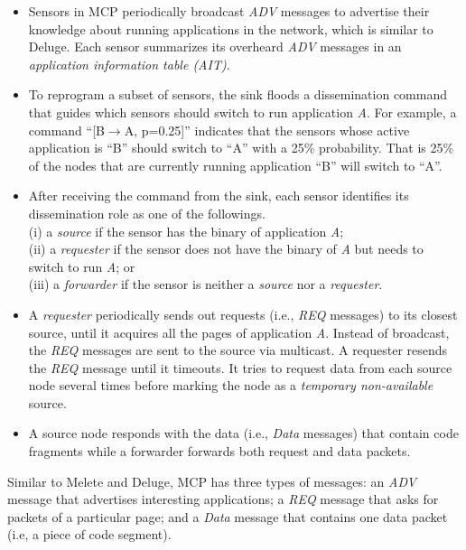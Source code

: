 \begin{itemize}
\item 
Sensors in MCP periodically broadcast {\it ADV} messages to advertise their knowledge about running applications in the 
network, which is similar to Deluge. Each sensor summarizes its overheard {\it ADV} messages in an {\em application 
information table (AIT)}. 

\item
To reprogram a subset of sensors, the sink floods a dissemination command that guides which sensors should switch to 
run application {\it A}. For example, a command ``[B$\rightarrow$A, p=0.25]'' indicates that the sensors whose active 
application is ``B'' should switch to ``A'' with a 25\% probability. That is 25\% of the nodes that are currently 
running application ``B'' will switch to ``A''.

\item
After receiving the command from the sink, each sensor identifies its dissemination role as one of the followings.  \\
(i)  a {\em source} if the sensor has the binary of application {\it A}; \\
(ii) a {\em requester} if the sensor does not have the binary of {\it A} but needs to switch to run {\it A}; or  \\
(iii) a {\em forwarder} if the sensor is neither a {\em source} nor a {\em requester}.

\item
A {\em requester} periodically sends out requests (i.e., {\it REQ} messages) to its closest source, until it acquires 
all the pages of application {\it A}. Instead of broadcast, the {\it REQ} messages are sent to the source via 
multicast. A requester resends the {\it REQ} message until it timeouts. It tries to request data from each source node 
several times before marking the node as a {\em temporary non-available} source.

\item 
A source node responds with the data (i.e., {\it Data} messages) that contain code fragments while a forwarder forwards 
both request and data packets. 
\end{itemize}

Similar to Melete and Deluge, MCP has three types of messages: an {\it ADV} message that advertises interesting 
applications; a {\it REQ} message that asks for packets of a particular page; and a {\it Data} message that contains 
one data packet (i.e, a piece of code segment).

